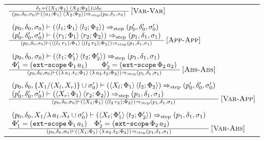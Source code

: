 \documentclass[a4paper,UKenglish]{lipics-v2016}
\makeatletter
\newenvironment*{premises}{\begin{array}{@{}l@{}}}{\end{array}}
\newcommand*{\infrule}[2]{\frac{\hspace{1ex}\vphantom{()}#1\hspace{1ex}}{\hspace{1ex}\vphantom{()}#2\hspace{1ex}}}
\newcommand*{\RNAME}[1]{\,\ensuremath{\textsc{[#1]}}}
\newcommand{\clos}[2] {
  \langle #1; #2 \rangle
}
\newcommand{\app}[2] {
  (#1\, #2)
}
\newcommand{\sframe}[7] {
  (#1, #2, #3) \vdash #4 \Rightarrow_\textrm{step} (#5, #6, #7)
}
\newcommand{\pr}[2] {
 (#1\, #2)
}
\newcommand{\bd}[2] {
 #1/ #2
}
\makeatother
\begin{document}
\begin{figure}
\begin{minipage}[b]{\textwidth}
\begin{tabular}{l}
    $\infrule{%
    \delta_1 = \pr{\clos{X_1}{\Phi_1}}{\clos{X_2}{\Phi_2}} \cup \delta_0
    }{\sframe{p_0}{\delta_0}{\sigma_0}{\pr{\clos{a_1}{\Phi_1}}{\clos{X_2}{\Phi_2}}}{p_0}{\delta_1}{\sigma_0}}
    \RNAME{Var-Var}$ \\ \\

    $\infrule{%
        \begin{premises}
              \sframe{p_0}{\delta_0}{\sigma_0}{\pr{\clos{l_1}{\Phi_1}}{\clos{l_2}{\Phi_2}}}{p_0'}{\delta_0'}{\sigma_0'} \\
    \sframe{p_0'}{\delta_0'}{\sigma_0'}{\pr{\clos{r_1}{\Phi_1}}{\clos{r_2}{\Phi_2}}}{p_1}{\delta_1}{\sigma_1}
    \end{premises}
    }{\sframe{p_0}{\delta_0}{\sigma_0}{\pr{\clos{\app{l_1}{r_1}}{\Phi_1}}{\clos{\app{l_2}{r_2}}{\Phi_2}}}{p_1}{\delta_1}{\sigma_1}}
    \RNAME{App-App}$ \\ \\

    $\infrule{%
        \begin{premises}
    \sframe{p_0}{\delta_0}{\sigma_0}{\pr{\clos{t_1}{\Phi_1'}}{\clos{t_2}{\Phi_2'}}}{p_1}{\delta_1}{\sigma_1}\\
    \Phi_1' = (\texttt{ext-scope}\, \Phi_1\, a_1) \qquad \Phi_2' = (\texttt{ext-scope}\, \Phi_2\, a_2)
    \end{premises}
    }{\sframe{p_0}{\delta_0}{\sigma_0}{\pr{\clos{\lambda\,a_1.t_1}{\Phi_1}}{\clos{\lambda\,a_2.t_2}{\Phi_2}}}{p_1}{\delta_1}{\sigma_1}}
    \RNAME{Abs-Abs}$ \\ \\

    $\infrule{%
    \begin{premises}
    \sframe{p_0}{\delta_0}{\{X_1/(X_l, X_r)\}\cup\sigma_0'}{\pr{\clos{X_l}{\Phi_1}}{\clos{l_2}{\Phi_2}}}{p_0'}{\delta_0'}{\sigma_0'} \\
    \sframe{p_0'}{\delta_0'}{\sigma_0'}{\pr{\clos{X_r}{\Phi_1}}{\clos{r_2}{\Phi_2}}}{p_1}{\delta_1}{\sigma_1} 
    \end{premises}
    }{\sframe{p_0}{\delta_0}{\sigma_0}{\pr{\clos{X_1}{\Phi_1}}{\clos{\app{l_2}{r_2}}{\Phi_2}}}{p_1}{\delta_1}{\sigma_1}}
    \RNAME{Var-App}$ \\ \\

    $\infrule{%
    \begin{premises}
    \sframe{p_0}{\delta_0}{\bd{X_1}{\lambda\,a_1.X_t}\cup\sigma_0'}{\pr{\clos{X_t}{\Phi_1'}}{\clos{t_2}{\Phi_2'}}}{p_1}{\delta_1}{\sigma_1} \\
    \Phi_1' = (\texttt{ext-scope}\, \Phi_1\, a_1) \quad \Phi_2' = (\texttt{ext-scope}\, \Phi_2\, a_2) 
  \end{premises}
    }{\sframe{p_0}{\delta_0}{\sigma_0}{\pr{\clos{X_1}{\Phi_1}}{\clos{\lambda\,a_2.t_2}{\Phi_2}}}{p_1}{\delta_1}{\sigma_1}}
    \RNAME{Var-Abs}$ 



  \end{tabular}
  \end{minipage}
\end{figure}
\end{document}
